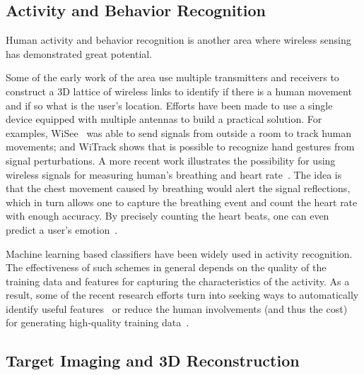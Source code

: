 \subsection{Activity and Behavior Recognition}
Human activity and behavior recognition is another area where wireless sensing has demonstrated great potential.

Some of the early work of the area use multiple transmitters and receivers to construct a 3D lattice of wireless links to identify if there
is a human movement and if so what is the user's location. Efforts have been made to use a single device equipped with multiple antennas to
build a practical solution. For examples, WiSee~\cite{WiSee} was able to send signals from outside a room to track human movements; and WiTrack
shows that is possible to recognize hand gestures from signal perturbations. A more recent work illustrates the possibility for using
wireless signals for measuring human's breathing and heart rate~\cite{ Smart-homes}. The idea is that the chest movement caused by
breathing would alert the signal reflections, which in turn allows one to capture the breathing event and count the heart rate with enough
accuracy. By precisely counting the heart beats, one can even predict a user's emotion~\cite{Zhao2017Emotion}.

Machine learning based classifiers have been widely used in activity recognition. The effectiveness of such schemes in general depends on
the quality of the training data and features for capturing the characteristics of the activity. As a result, some of the recent research
efforts turn into seeking ways to automatically identify useful features~\cite{CrossSense} or reduce the human involvements (and thus the
 cost) for generating high-quality training data~\cite{zhao2018rf}.





\subsection{Target Imaging and 3D Reconstruction}

